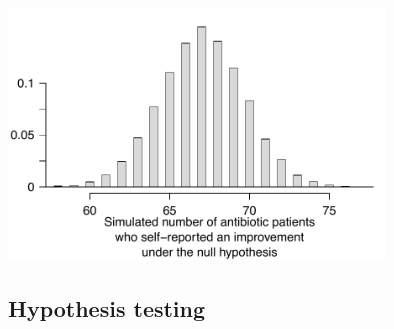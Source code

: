 {\begin{parts}
\begin{center}
\includegraphics[width = 0.75\textwidth]{02/figures/eoce/sinusitis/sinusitis}
\end{center}
\end{parts}
}{}

\textA{\newpage}


\subsection{Hypothesis testing}


